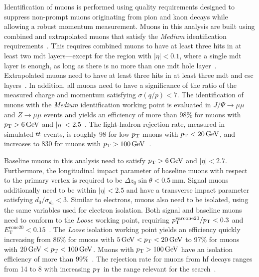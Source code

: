 Identification of muons is performed using quality requirements designed to suppress non-prompt muons originating from pion and kaon decays while allowing a robust momentum measurement. Muons in this analysis are built using combined and extrapolated muons that satisfy the \textit{Medium} identification requirements~\cite{PERF-2015-10}. This requires combined muons to have at least three hits in at least two \gls{mdt} layers---except for the region with $\vert\eta\vert < 0.1$, where a single \gls{mdt} layer is enough, as long as there is no more than one \gls{mdt} hole layer~\cite{Aad:2020gmm}. Extrapolated muons need to have at least three hits in at least three \gls{mdt} and \gls{csc} layers~\cite{Aad:2020gmm}. In addition, all muons need to have a significance of the ratio of the measured charge and momentum satisfying $\sigma(q/p) < 7$. The identification of muons with the \textit{Medium} identification working point is evaluated in $J/\Psi\rightarrow\mu\mu$ and $Z\rightarrow\mu\mu$ events and yields an efficiency of more than 98\% for muons with $\pt > \SI{6}{\GeV}$ and $\vert\eta\vert < 2.5$~\cite{Aad:2020gmm}. The light-hadron rejection rate, measured in simulated $t\bar{t}$ events, is roughly 98 for low-$p_{\textrm{T}}$ muons with $\pt < \SI{20}{\GeV}$, and increases to 830 for muons with $\pt > \SI{100}{\GeV}$~\cite{Aad:2020gmm}.

Baseline muons in this analysis need to satisfy $\pt > \SI{6}{\GeV}$ and $\vert\eta\vert < 2.7$. Furthermore, the longitudinal impact parameter of baseline muons with respect to the primary vertex is required to be $\Delta z_0\sin\theta < \SI{0.5}{\milli\meter}$. Signal muons additionally need to be within $\vert\eta\vert < 2.5$ and have a transverse impact parameter satisfying $d_0/\sigma_{d_0} < 3$. Similar to electrons, muons also need to be isolated, using the same variables used for electron isolation. Both signal and baseline muons need to conform to the \textit{Loose} working point, requiring $p_{\mathrm{T}}^{\mathrm{varcone20}}/p_{\textrm{T}} < 0.3$ and $E_{\mathrm{T}}^{\mathrm{cone20}} < 0.15$~\cite{Aad:2020gmm}. The \textit{Loose} isolation working point yields an efficiency quickly increasing from 86\% for muons with $\SI{5}{\GeV} < \pt < \SI{20}{\GeV}$ to 97\% for muons with $\SI{20}{\GeV} < \pt < \SI{100}{\GeV}$. Muons with $\pt > \SI{100}{\GeV}$ have an isolation efficiency of more than 99\%~\cite{Aad:2020gmm}. The rejection rate for muons from \gls{hf} decays ranges from 14 to 8 with increasing $p_{\textrm{T}}$ in the range relevant for the \onelepton search~\cite{Aad:2020gmm}.

